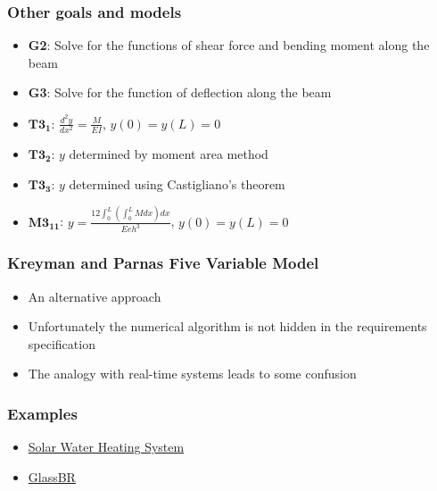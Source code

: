 \documentclass[t,12pt,numbers,fleqn]{beamer}
\begin{document}

\begin{frame}
\frametitle{Other goals and models}
\begin{itemize}
\item \textbf{G2}: Solve for the functions of shear force and bending moment along the beam
\item \textbf{G3}: Solve for the function of deflection along the beam
\item $\mathbf{T3_1}$: $\frac{d^2 y}{d x^2} = \frac{M}{EI}$, $y(0) = y(L) = 0$
\item $\mathbf{T3_2}$: $y$ determined by moment area method
\item $\mathbf{T3_3}$: $y$ determined using Castigliano's theorem
\item $\mathbf{M3_{11}}$: $y = \frac{12 \int_0^L (\int_0^L M dx) dx}{Eeh^3}$, $y(0) = y(L) = 0$
\end{itemize}
\end{frame}


\begin{frame}
\frametitle{Kreyman and Parnas Five Variable Model}
\begin{itemize}
\item An alternative approach
\item Unfortunately the numerical algorithm is not hidden in the requirements specification
\item The analogy with real-time systems leads to some confusion
\end{itemize}
\end{frame}


\begin{frame}
\frametitle{Examples}
\begin{itemize}
\item \href{https://github.com/smiths/swhs}{Solar Water Heating System}
\item \href{https://github.com/JacquesCarette/literate-scientific-software/tree/master/CaseStudies/glass/Documentation/SRS}{GlassBR}
\end{itemize}
\end{frame}

\end{document}
